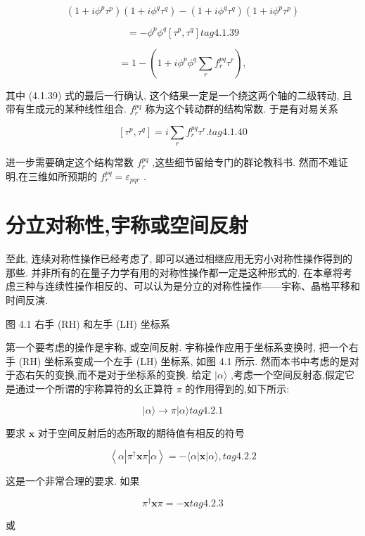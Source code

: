 $$
\left( {1 + i{\phi }^{p}{\tau }^{p}}\right) \left( {1 + i{\phi }^{q}{\tau }^{q}}\right) - \left( {1 + i{\phi }^{q}{\tau }^{q}}\right) \left( {1 + i{\phi }^{p}{\tau }^{p}}\right)
$$

$$
= - {\phi }^{p}{\phi }^{q}\left\lbrack {{\tau }^{p},{\tau }^{q}}\right\rbrack tag{4. 1.39}
$$

$$
= 1 - \left( {1 + i{\phi }^{p}{\phi }^{q}\mathop{\sum }\limits_{r}{f}_{r}^{pq}{\tau }^{r}}\right) ,
$$

其中 (4.1.39) 式的最后一行确认, 这个结果一定是一个绕这两个轴的二级转动, 且带有生成元的某种线性组合. ${f}_{r}^{pq}$ 称为这个转动群的结构常数. 于是有对易关系

$$
\left\lbrack {{\tau }^{p},{\tau }^{q}}\right\rbrack = i\mathop{\sum }\limits_{r}{f}_{r}^{pq}{\tau }^{r}. tag{4. 1.40}
$$

进一步需要确定这个结构常数 ${f}_{r}^{pq}$ ,这些细节留给专门的群论教科书. 然而不难证明,在三维如所预期的 ${f}_{r}^{pq} = {\varepsilon }_{pqr}$ .

\section{分立对称性,宇称或空间反射}

至此, 连续对称性操作已经考虑了, 即可以通过相继应用无穷小对称性操作得到的那些. 并非所有的在量子力学有用的对称性操作都一定是这种形式的. 在本章将考虑三种与连续性操作相反的、可以认为是分立的对称性操作——宇称、晶格平移和时间反演.


图 4.1 右手 (RH) 和左手 (LH) 坐标系

第一个要考虑的操作是宇称, 或空间反射. 宇称操作应用于坐标系变换时, 把一个右手 (RH) 坐标系变成一个左手 (LH) 坐标系, 如图 4.1 所示. 然而本书中考虑的是对于态右矢的变换,而不是对于坐标系的变换. 给定 $|\alpha \rangle$ ,考虑一个空间反射态,假定它是通过一个所谓的宇称算符的幺正算符 $\pi$ 的作用得到的,如下所示:

$$
\left| {\alpha \rangle \rightarrow \pi }\right| \alpha \rangle tag{4.2.1}
$$

要求 $\mathbf{x}$ 对于空间反射后的态所取的期待值有相反的符号

$$
\left\langle {\alpha \left| {{\pi }^{ \dagger }\mathbf{x}\pi }\right| \alpha }\right\rangle = - \langle \alpha \left| \mathbf{x}\right| \alpha \rangle , tag{4.2.2}
$$

这是一个非常合理的要求. 如果

$$
{\pi }^{ \dagger }\mathbf{x}\pi = - \mathbf{x} tag{4.2.3}
$$

或

